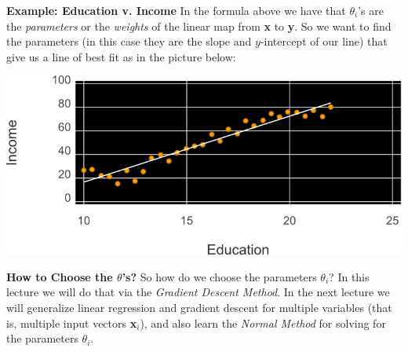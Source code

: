 \documentclass[xcolor=dvipsnames]{beamer}
\begin{document}
\begin{frame}
{\bf Example: Education v. Income}
In the formula above we have that $\theta_i$'s are the \emph{parameters} or the \emph{weights} of the linear map from {\bf x} to {\bf y}. \vfill\pause So we want to find the parameters (in this case they are the slope and $y$-intercept of our line) that give us a line of best fit as in the picture below:
\pause
\begin{center}
\includegraphics[scale=.75]{myplot.png}
\end{center}
\end{frame}

\begin{frame}
{\bf How to Choose the $\theta$'s?}
So how do we choose the parameters $\theta_i$? \vfill\pause 
In this lecture we will do that via the \emph{Gradient Descent Method}.
\vfill\pause  
In the next lecture we will generalize linear regression and gradient descent for multiple variables (that is, multiple input vectors {\bf x}$_i$), and also learn the \emph{Normal Method} for solving for the parameters $\theta_i$. 
\end{frame}
\end{document}
